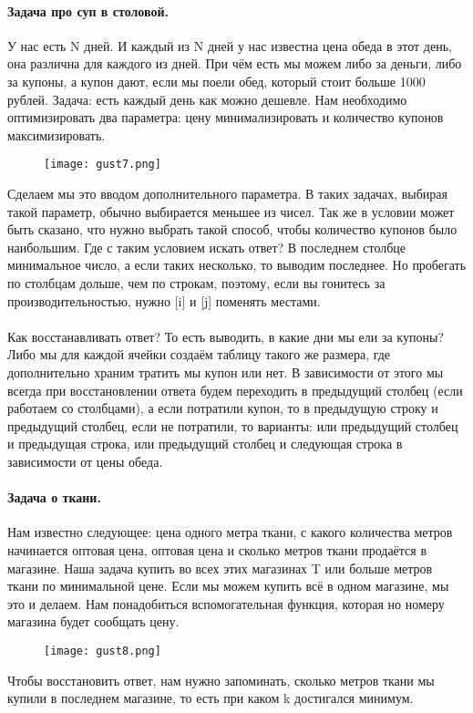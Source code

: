\documentclass[a4paper,12pt]{article}
\begin{document}
\paragraph{Задача про суп в столовой.}
У нас есть N дней. И каждый из N дней у нас известна цена обеда в этот день, она различна для каждого из дней. При чём есть мы можем либо за деньги, либо за купоны, а купон дают, если мы поели обед, который стоит больше 1000 рублей. Задача: есть каждый день как можно дешевле. Нам необходимо оптимизировать два параметра: цену минимализировать и количество купонов максимизировать.  
\begin{figure}[h]
\centering
\texttt{[image: gust7.png]}
\end{figure}
Сделаем мы это вводом дополнительного параметра. В таких задачах, выбирая такой параметр, обычно выбирается меньшее из чисел. Так же в условии может быть сказано, что нужно выбрать такой способ, чтобы количество купонов было наибольшим. Где с таким условием искать ответ? В последнем столбце минимальное число, а если таких несколько, то выводим последнее. Но пробегать по столбцам дольше, чем по строкам, поэтому, если вы гонитесь за производительностью, нужно [i] и [j] поменять местами. \\ \\Как восстанавливать ответ? То есть выводить, в какие дни мы ели за купоны? Либо мы для каждой ячейки создаём таблицу такого же размера, где дополнительно храним тратить мы купон или нет. В зависимости от этого мы всегда при восстановлении ответа будем переходить в предыдущий столбец (если работаем со столбцами), а если потратили купон, то в предыдущую строку и предыдущий столбец, если не потратили, то варианты: или предыдущий столбец и предыдущая строка, или предыдущий столбец и следующая строка в зависимости от цены обеда.
\paragraph{Задача о ткани.}
Нам известно следующее: цена одного метра ткани, с какого количества метров начинается оптовая цена, оптовая цена и сколько метров ткани продаётся в магазине. Наша задача купить во всех этих магазинах T или больше метров ткани по минимальной цене. Если мы можем купить всё в одном магазине, мы это и делаем. Нам понадобиться вспомогательная функция, которая но номеру магазина будет сообщать цену. 
\begin{figure}[h]
\centering
\texttt{[image: gust8.png]}
\end{figure}
Чтобы восстановить ответ, нам нужно запоминать, сколько метров ткани мы купили в последнем магазине, то есть при каком k достигался минимум. 
\end{document}
